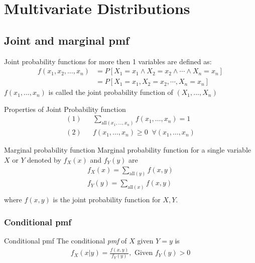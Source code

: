 \documentclass[16pt,a4paper]{article}
\begin{document}
\section{Multivariate Distributions}
\subsection{Joint and marginal pmf}
Joint probability functions for more then 1 variables are defined as: 
\begin{align*}
    f(x_1, x_2, \ldots, x_n) &= P[X_1 = x_1 \wedge X_2 = x_2 \wedge \cdots \wedge X_n = x_n]\\
    &= P[X_1 = x_1 , X_2 = x_2 , \cdots , X_n = x_n]
\end{align*} 
$f(x_1, \ldots, x_n)$ is called the joint probability function of $(X_1, \ldots, X_n)$ 

\begin{defn}{Properties of Joint Probability function}
    \begin{align*}
        (1) && \sum_{\mathrm{all}(x_1, \ldots, x_n)}f(x_1, \ldots, x_n) = 1\\
        (2) && f(x_1, \ldots, x_n) \geq 0 \;\; \forall (x_1, \ldots, x_n)
    \end{align*}
\end{defn}

\begin{defn}{Marginal probability function}
    Marginal probability function for a single variable $X$ or $Y$ denoted by $f_X(x)$ and $f_Y(y)$ are 
    \begin{align*}
        f_X(x) = \sum_{\text{all}(y)} f(x,y)\\
        f_Y(y) = \sum_{\text{all}(x)} f(x,y)\\
    \end{align*} 
    where $f(x,y)$ is the joint probability function for $X,Y$.  
\end{defn}
\subsubsection{Conditional pmf}
\begin{defn}{Conditional pmf}
    The conditional \textit{pmf} of $X$ given $Y = y$ is
    \begin{align*}
        f_X(x | y) =  \frac{f(x,y)}{f_Y(y)}, \text{ Given $f_Y(y) > 0$}
    \end{align*}
\end{defn}
\end{document}
